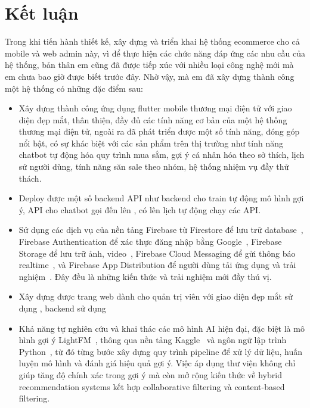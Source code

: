 \documentclass[../DoAn.tex]{subfiles}
\begin{document}
\section{Kết luận}
Trong khi tiến hành thiết kế, xây dựng và triển khai hệ thống ecommerce cho cả mobile và web admin này, vì để thực hiện các chức năng đáp ứng các nhu cầu của hệ thống, bản thân em cũng đã được tiếp xúc với nhiều loại công nghệ mới mà em chưa bao giờ được biết trước đây. Nhờ vậy, mà em đã xây dựng thành công một hệ thống có những đặc điểm sau:
\begin{itemize}
    \item Xây dựng thành công ứng dụng flutter mobile thương mại điện tử với giao diện đẹp mắt, thân thiện, đầy đủ các tính năng cơ bản của một hệ thống thương mại điện tử, ngoài ra đã phát triển được một số tính năng, đóng góp nổi bật, có sự khác biệt với các sản phẩm trên thị trường như tính năng chatbot tự động hóa quy trình mua sắm, gợi ý cá nhân hóa theo sở thích, lịch sử người dùng, tính năng săn sale theo nhóm, hệ thống nhiệm vụ đầy thử thách. 
    \item Deploy được một số backend API như backend cho train tự động mô hình gợi ý, API cho chatbot \cite{RasaFramework} gọi đến lên \cite{GoogleCloudRun}, có lên lịch tự động chạy các API.
     \item Sử dụng các dịch vụ của nền tảng Firebase từ Firestore để lưu trữ database~\cite{FirebaseFirestore}, 
  Firebase Authentication để xác thực đăng nhập bằng Google~\cite{FirebaseAuth}, 
  Firebase Storage để lưu trữ ảnh, video~\cite{FirebaseStorage}, 
  Firebase Cloud Messaging để gửi thông báo realtime~\cite{FirebaseCloudMessaging}, 
  và Firebase App Distribution để người dùng tải ứng dụng và trải nghiệm~\cite{FirebaseAppDistribution}. 
  Đây đều là những kiến thức và trải nghiệm mới đầy thú vị.
  \item Xây dựng được trang web dành cho quản trị viên với giao diện đẹp mắt sử dụng \cite{ReactJS}, backend sử dụng \cite{SpringBoot} 
  \item Khả năng tự nghiên cứu và khai thác các mô hình AI hiện đại, đặc biệt là mô hình gợi ý LightFM~\cite{LightFM}, thông qua nền tảng Kaggle~\cite{Kaggle} và ngôn ngữ lập trình Python~\cite{Python}, từ đó từng bước xây dựng quy trình pipeline để xử lý dữ liệu, huấn luyện mô hình và đánh giá hiệu quả gợi ý. Việc áp dụng thư viện \cite{LightFM} không chỉ giúp tăng độ chính xác trong gợi ý mà còn mở rộng kiến thức về hybrid recommendation systems kết hợp collaborative filtering và content-based filtering.

\end{itemize}
\end{document}

